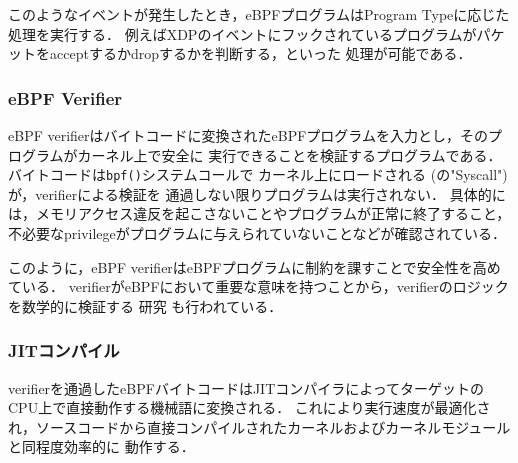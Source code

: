     このようなイベントが発生したとき，eBPFプログラムはProgram Typeに応じた処理を実行する．
    例えばXDPのイベントにフックされているプログラムがパケットをacceptするかdropするかを判断する，といった
    処理が可能である．
    
    \subsubsection{eBPF Verifier}
    eBPF verifierはバイトコードに変換されたeBPFプログラムを入力とし，そのプログラムがカーネル上で安全に
    実行できることを検証するプログラムである．バイトコードは\texttt{bpf()}システムコールで
    カーネル上にロードされる (の"Syscall") が，verifierによる検証を
    通過しない限りプログラムは実行されない．
    具体的には，メモリアクセス違反を起こさないことやプログラムが正常に終了すること，
    不必要なprivilegeがプログラムに与えられていないことなどが確認されている．
    
    このように，eBPF verifierはeBPFプログラムに制約を課すことで安全性を高めている．
    verifierがeBPFにおいて重要な意味を持つことから，verifierのロジックを数学的に検証する
    研究 \cite{vishwanathan2023verifying}も行われている．
    
    \subsubsection{JITコンパイル}
    verifierを通過したeBPFバイトコードはJITコンパイラによってターゲットのCPU上で直接動作する機械語に変換される．
    これにより実行速度が最適化され，ソースコードから直接コンパイルされたカーネルおよびカーネルモジュールと同程度効率的に
    動作する．
